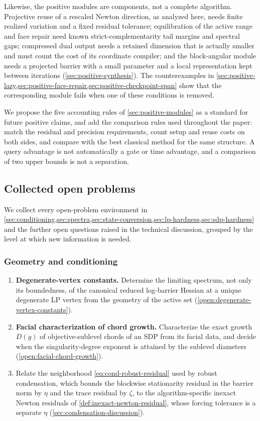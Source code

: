 Likewise, the positive modules are components, not a complete algorithm.
Projective reuse of a rescaled Newton direction, as analyzed here, needs
finite realized variation and a fixed residual tolerance; equilibration of
the active range and face repair need known strict-complementarity tail margins and spectral gaps;
compressed dual output needs a retained dimension that is actually smaller
and must count the cost of its coordinate compiler; and the block-angular
module needs a projected barrier with a small parameter and a local
representation kept between iterations (\cref{sec:positive-synthesis}).  The
counterexamples in
\cref{sec:positive-lazy,sec:positive-face-repair,sec:positive-checkpoint-span}
show that the corresponding module fails when one of these conditions is
removed.

We propose the five accounting rules of \cref{sec:positive-modules} as a
standard for future positive claims, and add the comparison rules used
throughout the paper: match the residual
and precision requirements, count setup and reuse costs on both sides, and
compare with the best classical method for the same structure.  A query
advantage is not automatically a gate or time advantage, and a comparison of
two upper bounds is not a separation.

\subsection{Collected open problems}
\label{sec:discussion-open}

We collect every open-problem environment in
\cref{sec:conditioning,sec:spectra,sec:state-conversion,sec:lp-hardness,sec:sdp-hardness}
and the further open questions raised in the technical discussion, grouped
by the level at which new information is needed.

\subsubsection{Geometry and conditioning}

\begin{enumerate}[leftmargin=*,label=G\arabic*.]
 \item \textbf{Degenerate-vertex constants.}  Determine the limiting spectrum,
 not only its boundedness, of the canonical reduced log-barrier Hessian at a
 unique degenerate LP vertex from the geometry of the active set
 (\cref{open:degenerate-vertex-constants}).
 \item \textbf{Facial characterization of chord growth.}  Characterize the
 exact growth \(D(g)\) of objective-sublevel chords of an SDP from its facial
 data, and decide when the singularity-degree exponent is attained by the
 sublevel diameters
 (\cref{open:facial-chord-growth}).
 \item Relate the neighborhood \eqref{eq:cond-robust-residual} used by robust
 condensation, which bounds the blockwise stationarity residual in the
 barrier norm by \(\eta\) and the trace residual by \(\zeta\), to the
 algorithm-specific inexact Newton residuals of
 \cref{def:inexact-newton-residual}, whose forcing tolerance is a separate
 \(\eta\) (\cref{sec:condensation-discussion}).
\end{enumerate}


